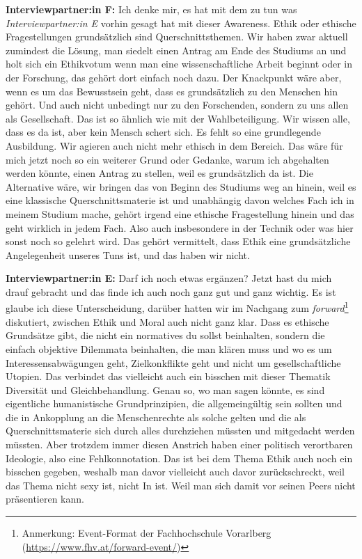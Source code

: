\documentclass[a4paper,12pt,twoside]{scrreprt}
\begin{document}
\textbf{Interviewpartner:in F:} Ich denke mir, es hat mit dem zu tun was \textit{Interviewpartner:in E} vorhin gesagt hat mit dieser Awareness. Ethik oder ethische Fragestellungen grundsätzlich sind Querschnittsthemen. Wir haben zwar aktuell zumindest die Lösung, man siedelt einen Antrag am Ende des Studiums an und holt sich ein Ethikvotum wenn man eine wissenschaftliche Arbeit beginnt oder in der Forschung, das gehört dort einfach noch dazu. Der Knackpunkt wäre aber, wenn es um das Bewusstsein geht, dass es grundsätzlich zu den Menschen hin gehört. Und auch nicht unbedingt nur zu den Forschenden, sondern zu uns allen als Gesellschaft. Das ist so ähnlich wie mit der Wahlbeteiligung. Wir wissen alle, dass es da ist, aber kein Mensch schert sich. Es fehlt so eine grundlegende Ausbildung. Wir agieren auch nicht mehr ethisch in dem Bereich. Das wäre für mich jetzt noch so ein weiterer Grund oder Gedanke, warum ich abgehalten werden könnte, einen Antrag zu stellen, weil es grundsätzlich da ist. Die Alternative wäre, wir bringen das von Beginn des Studiums weg an hinein, weil es eine klassische Querschnittsmaterie ist und unabhängig davon welches Fach ich in meinem Studium mache, gehört irgend eine ethische Fragestellung hinein und das geht wirklich in jedem Fach. Also auch insbesondere in der Technik oder was hier sonst noch so gelehrt wird. Das gehört vermittelt, dass Ethik eine grundsätzliche Angelegenheit unseres Tuns ist, und das haben wir nicht.

\textbf{Interviewpartner:in E:} Darf ich noch etwas ergänzen? Jetzt hast du mich drauf gebracht und das finde ich auch noch ganz gut und ganz wichtig. Es ist glaube ich diese Unterscheidung, darüber hatten wir im Nachgang zum \textit{forward}\footnote{Anmerkung: Event-Format der Fachhochschule Vorarlberg (\url{https://www.fhv.at/forward-event/})} diskutiert, zwischen Ethik und Moral auch nicht ganz klar. Dass es ethische Grundsätze gibt, die nicht ein normatives du sollst beinhalten, sondern die einfach objektive Dilemmata beinhalten, die man klären muss und wo es um Interessensabwägungen geht, Zielkonkflikte geht und nicht um gesellschaftliche Utopien. Das verbindet das vielleicht auch ein bisschen mit dieser Thematik Diversität und Gleichbehandlung. Genau so, wo man sagen könnte, es sind eigentliche humanistische Grundprinzipien, die allgemeingültig sein sollten und die in Ankopplung an die Menschenrechte als solche gelten und die als Querschnittsmaterie sich durch alles durchziehen müssten und mitgedacht werden müssten. Aber trotzdem immer diesen Anstrich haben einer politisch verortbaren Ideologie, also eine Fehlkonnotation. Das ist bei dem Thema Ethik auch noch ein bisschen gegeben, weshalb man davor vielleicht auch davor zurückschreckt, weil das Thema nicht sexy ist, nicht In ist. Weil man sich damit vor seinen Peers nicht präsentieren kann.
\end{document}
